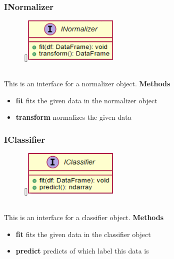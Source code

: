 \subsubsection{INormalizer}
\label{INormalizer}
\begin{figure}
    \raisebox{0pt}[\dimexpr{}\baselineskip\relax]{\includegraphics[width=4.5cm]{classes/model-management/10.png}}
\end{figure} 
~\\
This is an interface for a normalizer object.
\newline
\newline
\newline
\newline
\newline
\textbf{Methods}
\begin{itemize}
    \item \textbf{fit} fits the given data in the normalizer object
    \item \textbf{transform} normalizes the given data
\end{itemize}

\newpage
\subsubsection{IClassifier}
\label{IClassifier}
\begin{figure}
    \raisebox{0pt}[\dimexpr{}\baselineskip\relax]{\includegraphics[width=4.5cm]{classes/model-management/11.png}}
\end{figure} 
~\\
This is an interface for a classifier object.
\newline
\newline
\newline
\newline
\newline
\textbf{Methods}
\begin{itemize}
    \item \textbf{fit} fits the given data in the classifier object
    \item \textbf{predict} predicts of which label this data is
\end{itemize}

